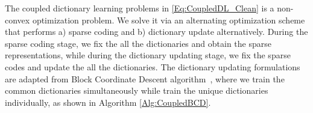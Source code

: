 \documentclass{article}
\begin{document}






The coupled dictionary learning problems in \eqref{Eq:CoupledDL_Clean} is a non-convex optimization problem. 
We solve it via an alternating optimization scheme that performs a) sparse coding and b) dictionary update alternatively. During the sparse coding stage, we fix the all the dictionaries and obtain the sparse representations, while during the dictionary updating stage, we fix the sparse codes and update the all the dictionaries. The dictionary updating formulations are adapted from Block Coordinate Descent algorithm~\cite{mairal2010online}, where we train the common dictionaries simultaneously while train the unique dictionaries individually, as shown in Algorithm \ref{Alg:CoupledBCD}.
\end{document}
